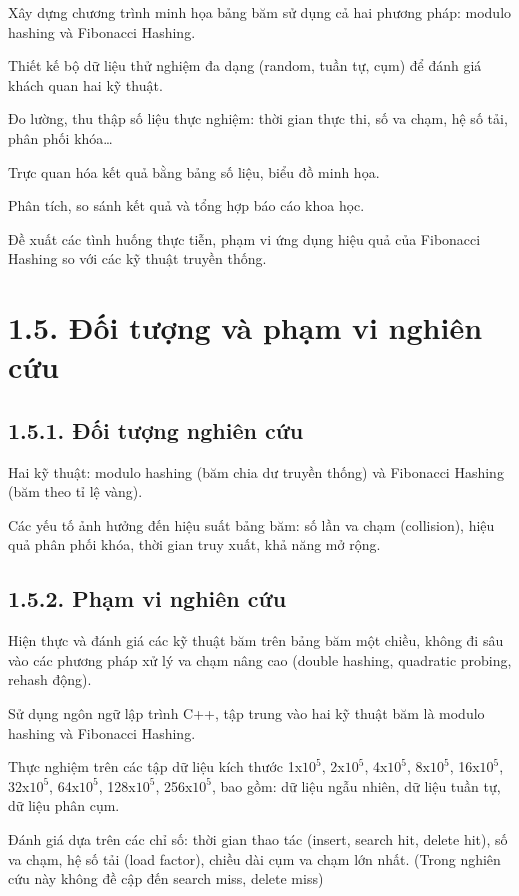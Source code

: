 \documentclass[12pt,a4paper]{report}
\begin{document}
Xây dựng chương trình minh họa bảng băm sử dụng cả hai phương pháp: modulo hashing và Fibonacci Hashing.

Thiết kế bộ dữ liệu thử nghiệm đa dạng (random, tuần tự, cụm) để đánh giá khách quan hai kỹ thuật.

Đo lường, thu thập số liệu thực nghiệm: thời gian thực thi, số va chạm, hệ số tải, phân phối khóa…

Trực quan hóa kết quả bằng bảng số liệu, biểu đồ minh họa.

Phân tích, so sánh kết quả và tổng hợp báo cáo khoa học.

Đề xuất các tình huống thực tiễn, phạm vi ứng dụng hiệu quả của Fibonacci Hashing so với các kỹ thuật truyền thống.

\section*{1.5. Đối tượng và phạm vi nghiên cứu}
\subsection*{1.5.1. Đối tượng nghiên cứu}
\noindent \indent Hai kỹ thuật: modulo hashing (băm chia dư truyền thống) và Fibonacci Hashing (băm theo tỉ lệ vàng).

Các yếu tố ảnh hưởng đến hiệu suất bảng băm: số lần va chạm (collision), hiệu quả phân phối khóa, thời gian truy xuất, khả năng mở rộng.
\subsection*{1.5.2. Phạm vi nghiên cứu}
\noindent \indent Hiện thực và đánh giá các kỹ thuật băm trên bảng băm một chiều, không đi sâu vào các phương pháp xử lý va chạm nâng cao (double hashing, quadratic probing, rehash động).

Sử dụng ngôn ngữ lập trình C++, tập trung vào hai kỹ thuật băm là modulo hashing và Fibonacci Hashing.

Thực nghiệm trên các tập dữ liệu kích thước 1x$10^5$, 2x$10^5$, 4x$10^5$, 8x$10^5$, 16x$10^5$, 32x$10^5$, 64x$10^5$, 128x$10^5$, 256x$10^5$, bao gồm: dữ liệu ngẫu nhiên, dữ liệu tuần tự, dữ liệu phân cụm.

Đánh giá dựa trên các chỉ số: thời gian thao tác (insert, search hit, delete hit), số va chạm, hệ số tải (load factor), chiều dài cụm va chạm lớn nhất. (Trong nghiên cứu này không đề cập đến search miss, delete miss) 
\end{document}
